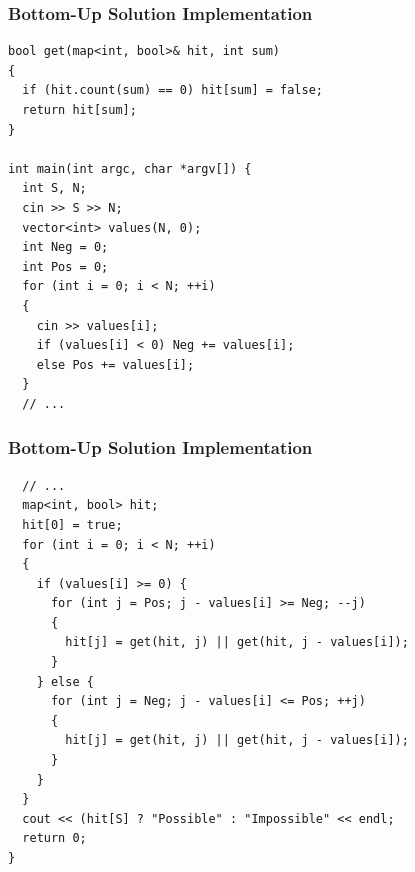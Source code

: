 \documentclass{beamer}
\begin{document}
\begin{frame}[containsverbatim]
\frametitle{Bottom-Up Solution Implementation}
\scriptsize

\begin{lstlisting}
bool get(map<int, bool>& hit, int sum)
{
  if (hit.count(sum) == 0) hit[sum] = false;
  return hit[sum];
}

int main(int argc, char *argv[]) {
  int S, N;
  cin >> S >> N;
  vector<int> values(N, 0);
  int Neg = 0;
  int Pos = 0;
  for (int i = 0; i < N; ++i)
  {
    cin >> values[i];
    if (values[i] < 0) Neg += values[i];
    else Pos += values[i];
  }
  // ...
\end{lstlisting}

\end{frame}

\begin{frame}[containsverbatim]
\frametitle{Bottom-Up Solution Implementation}
\scriptsize

\begin{lstlisting}
  // ...
  map<int, bool> hit;
  hit[0] = true;
  for (int i = 0; i < N; ++i)
  {
    if (values[i] >= 0) {
      for (int j = Pos; j - values[i] >= Neg; --j)
      {
        hit[j] = get(hit, j) || get(hit, j - values[i]);
      }
    } else {
      for (int j = Neg; j - values[i] <= Pos; ++j)
      {
        hit[j] = get(hit, j) || get(hit, j - values[i]);
      }
    }
  }
  cout << (hit[S] ? "Possible" : "Impossible" << endl;
  return 0;
}
\end{lstlisting}

\end{frame}

\fi
\end{document}
